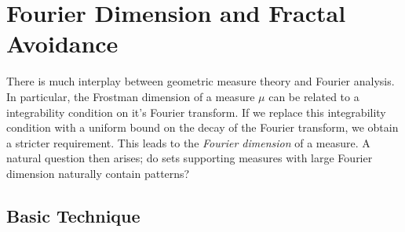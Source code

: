
\chapter{Fourier Dimension and Fractal Avoidance}
\label{ch:RoughSets}

There is much interplay between geometric measure theory and Fourier analysis. In particular, the Frostman dimension of a measure $\mu$ can be related to a integrability condition on it's Fourier transform. If we replace this integrability condition with a uniform bound on the decay of the Fourier transform, we obtain a stricter requirement. This leads to the \emph{Fourier dimension} of a measure. A natural question then arises; do sets supporting measures with large Fourier dimension naturally contain patterns?

\section{Basic Technique}

